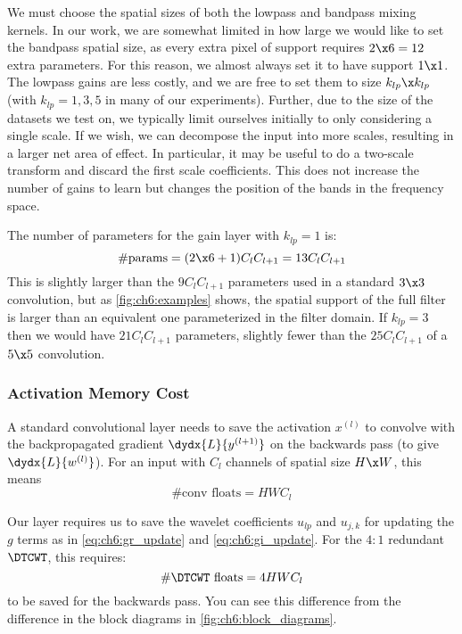 We must choose the spatial sizes of both the lowpass and bandpass
mixing kernels. In our work, we are somewhat limited in how large we would like
to set the bandpass spatial size, as every extra pixel of support requires $2\x
6=12$ extra parameters. For this reason, we almost always set it to have 
support $1\x 1$. The lowpass gains are less costly, and we are free to set them to size
$k_{lp}\x k_{lp}$ (with $k_{lp} = 1,3,5$ in many of our experiments).
%
Further, due to the size of the datasets we test on, we typically limit
ourselves initially to only considering a single scale. If we wish, we can
decompose the input into more scales, resulting in a larger net area of effect.
In particular, it may be useful to do a two-scale transform and discard the
first scale coefficients. This does not increase the number of gains to learn
but changes the position of the bands in the frequency space.

The number of parameters for the gain layer with $k_{lp}=1$ is:
\begin{equation}
  \text{\#params} = (2\x 6 + 1)C_lC_{l+1} = 13C_lC_{l+1} \label{eq:ch6:memcost2}
\end{equation} 
%
This is slightly larger than the $9C_lC_{l+1}$ parameters used in a
standard $3\x 3$ convolution, but as \autoref{fig:ch6:examples} shows, the
spatial support of the full filter is larger than an equivalent one
parameterized in the filter domain. If $k_{lp}=3$ then we would have $21C_l
C_{l+1}$ parameters, slightly fewer than the $25C_l C_{l+1}$ of a $5\x 5$ convolution.

\subsubsection{Activation Memory Cost}\label{sec:ch6:act_memory}
A standard convolutional layer needs to save the activation $x^{(l)}$ to
convolve with the backpropagated gradient $\dydx{L}{y^{(l+1)}}$ on the backwards
pass (to give $\dydx{L}{w^{(l)}}$). For an input with $C_l$ channels of spatial
size $H\x W$, this means
%
\begin{equation}
  \text{\#conv floats} = HWC_l 
\end{equation}

Our layer requires us to save the wavelet coefficients $u_{lp}$ and $u_{j,k}$
for updating the $g$ terms as in \eqref{eq:ch6:gr_update} and \eqref{eq:ch6:gi_update}.  
For the $4:1$ redundant $\DTCWT$, this requires:
%
\begin{equation}
  \text{\#$\DTCWT$ floats} = 4HWC_l 
\end{equation}
%
to be saved for the backwards pass.  You can see this difference from the
difference in the block diagrams in \autoref{fig:ch6:block_diagrams}.

